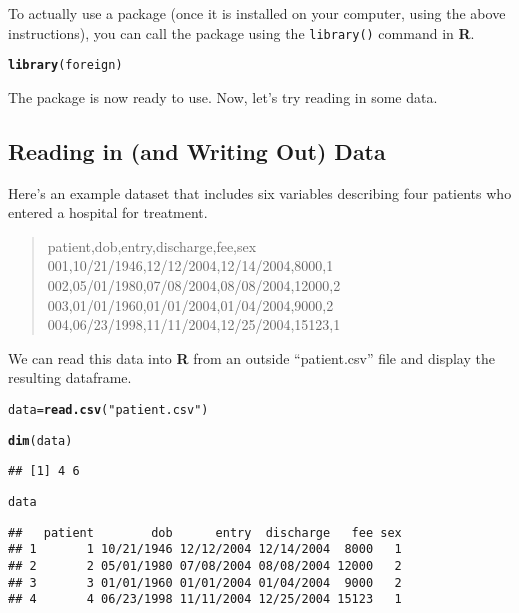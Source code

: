\documentclass[12pt]{article}\usepackage[]{graphicx}\usepackage[]{color}
\makeatletter
\newcommand{\hlstr}[1]{\textcolor[rgb]{0.192,0.494,0.8}{#1}}%
\newcommand{\hlstd}[1]{\textcolor[rgb]{0.345,0.345,0.345}{#1}}%
\newcommand{\hlkwb}[1]{\textcolor[rgb]{0.69,0.353,0.396}{#1}}%
\newcommand{\hlkwd}[1]{\textcolor[rgb]{0.737,0.353,0.396}{\textbf{#1}}}%
\newenvironment{kframe}{%
 \def\at@end@of@kframe{}%
 \ifinner\ifhmode%
  \def\at@end@of@kframe{\end{minipage}}%
  \begin{minipage}{\columnwidth}%
 \fi\fi%
 \def\FrameCommand##1{\hskip\@totalleftmargin \hskip-\fboxsep
 \colorbox{shadecolor}{##1}\hskip-\fboxsep
     \hskip-\linewidth \hskip-\@totalleftmargin \hskip\columnwidth}%
 \MakeFramed {\advance\hsize-\width
   \@totalleftmargin\z@ \linewidth\hsize
   \@setminipage}}%
 {\par\unskip\endMakeFramed%
 \at@end@of@kframe}
\newenvironment{knitrout}{}{} %
\makeatother
\begin{document}
To actually use a package (once it is installed on your computer, using the above instructions), you can call the package using the \verb|library()| command in \textbf{R}.
\begin{knitrout}
\color{fgcolor}\begin{kframe}
\begin{alltt}
\hlkwd{library}\hlstd{(foreign)}
\end{alltt}
\end{kframe}
\end{knitrout}

The package is now ready to use. Now, let's try reading in some data.

\subsection{Reading in (and Writing Out) Data}
Here's an example dataset that includes six variables describing four patients who entered a hospital for treatment.
\begin{quote}
patient,dob,entry,discharge,fee,sex\\
001,10/21/1946,12/12/2004,12/14/2004,8000,1\\
002,05/01/1980,07/08/2004,08/08/2004,12000,2\\
003,01/01/1960,01/01/2004,01/04/2004,9000,2\\
004,06/23/1998,11/11/2004,12/25/2004,15123,1\\
\end{quote}
We can read this data into \textbf{R} from an outside ``patient.csv'' file and display the resulting dataframe.
\begin{knitrout}
\color{fgcolor}\begin{kframe}
\begin{alltt}
\hlstd{data} \hlkwb{=} \hlkwd{read.csv}\hlstd{(}\hlstr{"patient.csv"}\hlstd{)}
\end{alltt}


{\ttfamily\noindent\color{warningcolor}{\#\# Warning: incomplete final line found by readTableHeader on 'patient.csv'}}\begin{alltt}
\hlkwd{dim}\hlstd{(data)}
\end{alltt}
\begin{verbatim}
## [1] 4 6
\end{verbatim}
\begin{alltt}
\hlstd{data}
\end{alltt}
\begin{verbatim}
##   patient        dob      entry  discharge   fee sex
## 1       1 10/21/1946 12/12/2004 12/14/2004  8000   1
## 2       2 05/01/1980 07/08/2004 08/08/2004 12000   2
## 3       3 01/01/1960 01/01/2004 01/04/2004  9000   2
## 4       4 06/23/1998 11/11/2004 12/25/2004 15123   1
\end{verbatim}
\end{kframe}
\end{knitrout}
\end{document}
